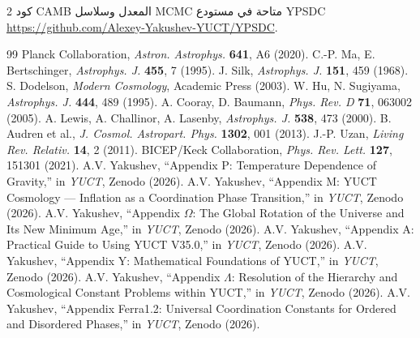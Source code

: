 \documentclass[11pt,a4paper]{article}
\begin{document}
\begin{multicols}{2}
		كود CAMB المعدل وسلاسل MCMC متاحة في مستودع YPSDC \url{https://github.com/Alexey-Yakushev-YUCT/YPSDC}.
		
		\begin{thebibliography}{99}
			 Planck Collaboration, \emph{Astron. Astrophys.} \textbf{641}, A6 (2020).
			 C.-P. Ma, E. Bertschinger, \emph{Astrophys. J.} \textbf{455}, 7 (1995).
			 J. Silk, \emph{Astrophys. J.} \textbf{151}, 459 (1968).
			 S. Dodelson, \emph{Modern Cosmology}, Academic Press (2003).
			 W. Hu, N. Sugiyama, \emph{Astrophys. J.} \textbf{444}, 489 (1995).
			 A. Cooray, D. Baumann, \emph{Phys. Rev. D} \textbf{71}, 063002 (2005).
			 A. Lewis, A. Challinor, A. Lasenby, \emph{Astrophys. J.} \textbf{538}, 473 (2000).
			 B. Audren et al., \emph{J. Cosmol. Astropart. Phys.} \textbf{1302}, 001 (2013).
			 J.-P. Uzan, \emph{Living Rev. Relativ.} \textbf{14}, 2 (2011).
			 BICEP/Keck Collaboration, \emph{Phys. Rev. Lett.} \textbf{127}, 151301 (2021).
			 A.V. Yakushev, ``Appendix P: Temperature Dependence of Gravity,'' in \emph{YUCT}, Zenodo (2026).
			 A.V. Yakushev, ``Appendix M: YUCT Cosmology — Inflation as a Coordination Phase Transition,'' in \emph{YUCT}, Zenodo (2026).
			 A.V. Yakushev, ``Appendix $\Omega$: The Global Rotation of the Universe and Its New Minimum Age,'' in \emph{YUCT}, Zenodo (2026).
			 A.V. Yakushev, ``Appendix A: Practical Guide to Using YUCT V35.0,'' in \emph{YUCT}, Zenodo (2026).
			 A.V. Yakushev, ``Appendix Y: Mathematical Foundations of YUCT,'' in \emph{YUCT}, Zenodo (2026).
			 A.V. Yakushev, ``Appendix $\Lambda$: Resolution of the Hierarchy and Cosmological Constant Problems within YUCT,'' in \emph{YUCT}, Zenodo (2026).
			 A.V. Yakushev, ``Appendix Ferra1.2: Universal Coordination Constants for Ordered and Disordered Phases,'' in \emph{YUCT}, Zenodo (2026).
		\end{thebibliography}
		
	\end{multicols}
\end{document}
